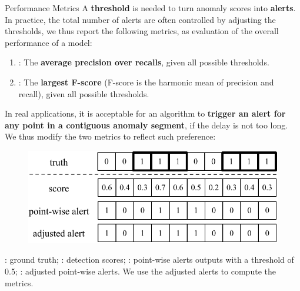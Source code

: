 \documentclass[usenames,dvipsnames]{beamer}
\newcommand{\emphasis}[1]{\textbf{\textcolor{emphcolor}{#1}}}
\begin{document}
\begin{frame}{Performance Metrics}
  \small
  A \emphasis{threshold} is needed to turn anomaly scores into \emphasis{alerts}.
  In practice, the total number of alerts are often controlled by adjusting the thresholds, we thus report the following metrics, as evaluation of the overall performance of a model:
  \begin{enumerate}\small\setlength\itemsep{0em}
    \item {}: The \emphasis{average precision over recalls}, given all possible thresholds.
    \item {}: The \emphasis{largest F-score} (F-score is the harmonic mean of precision and recall), given all possible thresholds.
  \end{enumerate}

  \small
  In real applications, it is acceptable for an algorithm to \emphasis{trigger an alert for any point in a contiguous anomaly segment}, if the delay is not too long.  We thus modify the two metrics to reflect such preference:
  
  \vspace{1em}
  \begin{minipage}{0.54\textwidth}
    \begin{figure}
	  \includegraphics[height=.26\textheight]{metric-illustration}
    \end{figure}
  \end{minipage}\hfill
  \begin{minipage}{0.43\textwidth}
   : ground truth; : detection scores; : point-wise alerts outputs with a threshold of 0.5; : adjusted point-wise alerts.  We use the adjusted alerts to compute the metrics.
  \end{minipage}
\end{frame}
\end{document}
